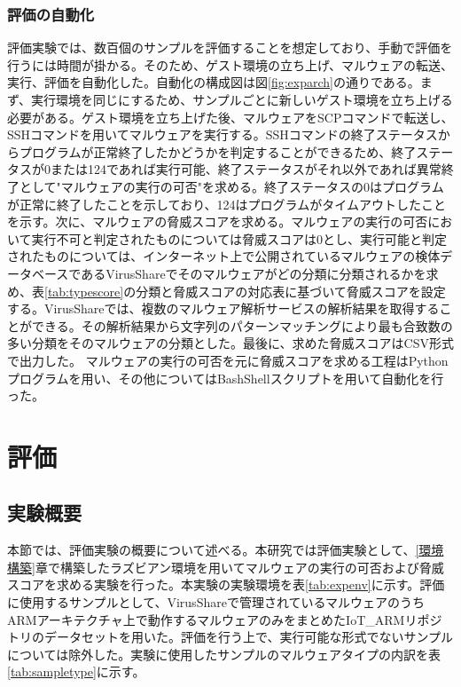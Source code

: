 \documentclass[12pt,a4paper,titlepage,report]{jsbook}
\begin{document}
\subsection{評価の自動化}
評価実験では、数百個のサンプルを評価することを想定しており、手動で評価を行うには時間が掛かる。そのため、ゲスト環境の立ち上げ、マルウェアの転送、実行、評価を自動化した。自動化の構成図は図\ref{fig:exparch}の通りである。まず、実行環境を同じにするため、サンプルごとに新しいゲスト環境を立ち上げる必要がある。ゲスト環境を立ち上げた後、マルウェアをSCPコマンドで転送し、SSHコマンドを用いてマルウェアを実行する。SSHコマンドの終了ステータスからプログラムが正常終了したかどうかを判定することができるため、終了ステータスが0または124であれば実行可能、終了ステータスがそれ以外であれば異常終了として"マルウェアの実行の可否"を求める。終了ステータスの0はプログラムが正常に終了したことを示しており、124はプログラムがタイムアウトしたことを示す。次に、マルウェアの脅威スコアを求める。マルウェアの実行の可否において実行不可と判定されたものについては脅威スコアは0とし、実行可能と判定されたものについては、インターネット上で公開されているマルウェアの検体データベースであるVirusShareでそのマルウェアがどの分類に分類されるかを求め、表\ref{tab:typescore}の分類と脅威スコアの対応表に基づいて脅威スコアを設定する。VirusShareでは、複数のマルウェア解析サービスの解析結果を取得することができる。その解析結果から文字列のパターンマッチングにより最も合致数の多い分類をそのマルウェアの分類とした。最後に、求めた脅威スコアはCSV形式で出力した。
マルウェアの実行の可否を元に脅威スコアを求める工程はPythonプログラムを用い、その他についてはBashShellスクリプトを用いて自動化を行った。




\chapter{評価}
\section{実験概要}
本節では、評価実験の概要について述べる。本研究では評価実験として、\ref{環境構築}章で構築したラズビアン環境を用いてマルウェアの実行の可否および脅威スコアを求める実験を行った。本実験の実験環境を表\ref{tab:expenv}に示す。評価に使用するサンプルとして、VirusShareで管理されているマルウェアのうちARMアーキテクチャ上で動作するマルウェアのみをまとめたIoT\_ARMリポジトリ\cite{iotarm}のデータセットを用いた。評価を行う上で、実行可能な形式でないサンプルについては除外した。実験に使用したサンプルのマルウェアタイプの内訳を表\ref{tab:sampletype}に示す。
\end{document}
